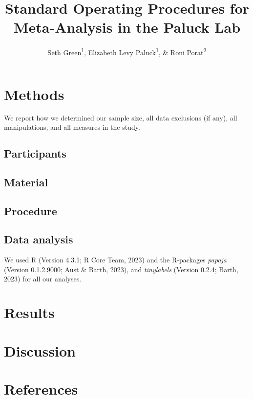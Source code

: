 \documentclass[
  man]{apa6}
\title{Standard Operating Procedures for Meta-Analysis in the Paluck Lab}
\author{Seth Green\textsuperscript{1}, Elizabeth Levy Paluck\textsuperscript{1}, \& Roni Porat\textsuperscript{2}}
\date{}
\affiliation{\vspace{0.5cm}\textsuperscript{1} Princeton University\\\textsuperscript{2} Hebrew University, Jerusalem}
\begin{document}
\maketitle

\section{Methods}\label{methods}

We report how we determined our sample size, all data exclusions (if any), all manipulations, and all measures in the study.

\subsection{Participants}\label{participants}

\subsection{Material}\label{material}

\subsection{Procedure}\label{procedure}

\subsection{Data analysis}\label{data-analysis}

We used R (Version 4.3.1; R Core Team, 2023) and the R-packages \emph{papaja} (Version 0.1.2.9000; Aust \& Barth, 2023), and \emph{tinylabels} (Version 0.2.4; Barth, 2023) for all our analyses.

\section{Results}\label{results}

\section{Discussion}\label{discussion}

\newpage

\section{References}\label{references}
\end{document}
